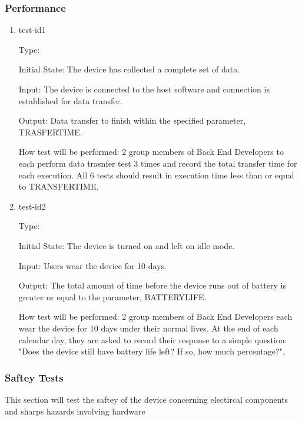 \documentclass[12pt, titlepage]{article}
\begin{document}
\subsubsection{Performance}

\begin{enumerate}

\item{test-id1\\}

Type: 
					
Initial State: The device has collected a complete set of data.
					
Input: The device is connected to the host software and connection is established for data transfer.
					
Output: Data transfer to finish within the specified parameter, TRASFERTIME.
					
How test will be performed: 2 group members of Back End Developers to each perform data trasnfer test 3 times and record the total transfer time for each execution. All 6 tests should result in execution time less than or equal to TRANSFERTIME.

\item{test-id2\\}

Type: 
					
Initial State: The device is turned on and left on idle mode.
					
Input: Users wear the device for 10 days.
					
Output: The total amount of time before the device runs out of battery is greater or equal to the parameter, BATTERYLIFE.
					
How test will be performed: 2 group members of Back End Developers each wear the device for 10 days under their normal lives. At the end of each calendar day, they are asked to record their response to a simple question: "Does the device still have battery life left? If so, how much percentage?". 

\end{enumerate}

\subsubsection{Saftey Tests}

This section will test the saftey of the device concerning electircal components and sharps hazards involving hardware
\end{document}
